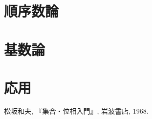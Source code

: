 \documentclass[a4paper]{bxjsarticle}
\theoremstyle{definition}
\newtheorem{rem}[thm]{注意}
\begin{document}
    
    
    
    \section{順序数論}
    \section{基数論}
    \section{応用}
    \begin{thebibliography}{9}
     松坂和夫, 『集合・位相入門』, 岩波書店, 1968.
    
    \end{thebibliography}
\end{document}
